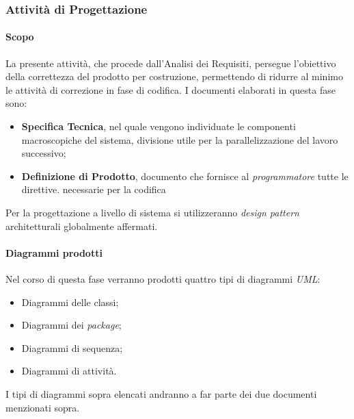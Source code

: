 			
		\subsubsection{Attività di Progettazione}
			\paragraph*{Scopo}
		        La presente attivit\`a, che procede dall'Analisi dei Requisiti, persegue l'obiettivo
		        della correttezza del prodotto per costruzione, permettendo di ridurre al minimo le attività di correzione
		        in fase di codifica.
                        I documenti elaborati in questa fase sono:
                        \begin{itemize}
                        \item \textbf{Specifica Tecnica}, nel quale vengono individuate le componenti macroscopiche del sistema,
                          divisione utile per la parallelizzazione del lavoro successivo;
                        \item \textbf{Definizione di Prodotto}, documento che fornisce al \textit{programmatore} tutte le direttive. necessarie per la codifica
                        \end{itemize}
		        Per la progettazione a livello di sistema si utilizzeranno \textit{design pattern} architetturali globalmente affermati.
                 
                        \paragraph*{Diagrammi prodotti}
                        Nel corso di questa fase verranno prodotti quattro tipi di diagrammi \textit{UML}:
                        \begin{itemize}
                        \item Diagrammi delle classi;
                        \item Diagrammi dei \textit{package};
                        \item Diagrammi di sequenza;
                        \item Diagrammi di attivit\`a.
                        \end{itemize}
                        I tipi di diagrammi sopra elencati andranno a far parte dei due documenti menzionati sopra.
		
